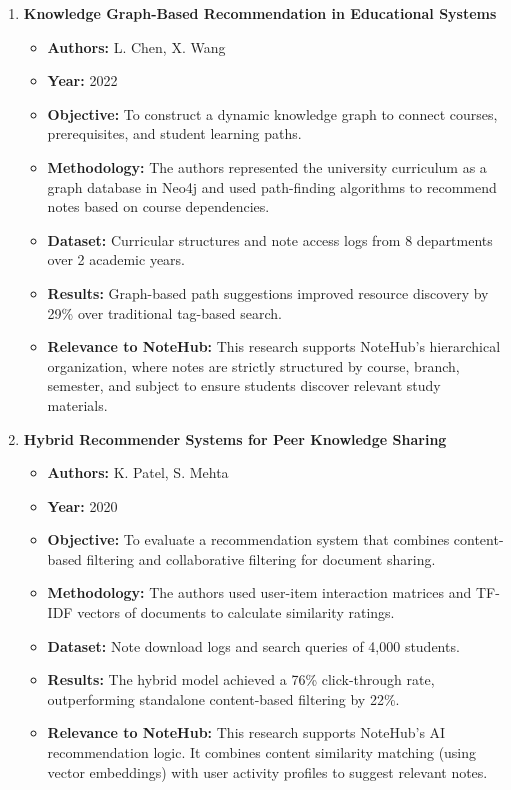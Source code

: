 \documentclass[12,Times new Roman,a4paper]{report}
\begin{document}
\begin{enumerate}
    \item \textbf{Knowledge Graph-Based Recommendation in Educational Systems}
    \begin{itemize}
        \item \textbf{Authors:} L. Chen, X. Wang
        \item \textbf{Year:} 2022
        \item \textbf{Objective:} To construct a dynamic knowledge graph to connect courses, prerequisites, and student learning paths.
        \item \textbf{Methodology:} The authors represented the university curriculum as a graph database in Neo4j and used path-finding algorithms to recommend notes based on course dependencies.
        \item \textbf{Dataset:} Curricular structures and note access logs from 8 departments over 2 academic years.
        \item \textbf{Results:} Graph-based path suggestions improved resource discovery by 29\% over traditional tag-based search.
        \item \textbf{Relevance to NoteHub:} This research supports NoteHub's hierarchical organization, where notes are strictly structured by course, branch, semester, and subject to ensure students discover relevant study materials.
    \end{itemize}

    \item \textbf{Hybrid Recommender Systems for Peer Knowledge Sharing}
    \begin{itemize}
        \item \textbf{Authors:} K. Patel, S. Mehta
        \item \textbf{Year:} 2020
        \item \textbf{Objective:} To evaluate a recommendation system that combines content-based filtering and collaborative filtering for document sharing.
        \item \textbf{Methodology:} The authors used user-item interaction matrices and TF-IDF vectors of documents to calculate similarity ratings.
        \item \textbf{Dataset:} Note download logs and search queries of 4,000 students.
        \item \textbf{Results:} The hybrid model achieved a 76\% click-through rate, outperforming standalone content-based filtering by 22\%.
        \item \textbf{Relevance to NoteHub:} This research supports NoteHub's AI recommendation logic. It combines content similarity matching (using vector embeddings) with user activity profiles to suggest relevant notes.
    \end{itemize}


\end{enumerate}
\end{document}
